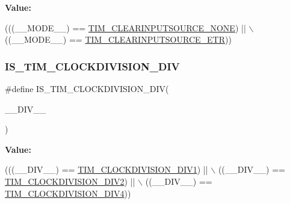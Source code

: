 {\bfseries Value\+:}
\begin{DoxyCode}
(((\_\_MODE\_\_) == \hyperlink{group___t_i_m___clear_input___source_ga48c5312aecd377fab00d62e9b4169e9e}{TIM\_CLEARINPUTSOURCE\_NONE})      || \(\backslash\)
                                             ((\_\_MODE\_\_) == 
      \hyperlink{group___t_i_m___clear_input___source_gaa28a8cf1db85cf6c845c6c1f02ba5c8e}{TIM\_CLEARINPUTSOURCE\_ETR}))
\end{DoxyCode}
\mbox{\label{group___t_i_m___private___macros_gac7f7ba7f6f173631c81176d4602c2f11}} 
\subsubsection{\texorpdfstring{I\+S\+\_\+\+T\+I\+M\+\_\+\+C\+L\+O\+C\+K\+D\+I\+V\+I\+S\+I\+O\+N\+\_\+\+D\+IV}{IS\_TIM\_CLOCKDIVISION\_DIV}}
{\footnotesize\ttfamily \#define I\+S\+\_\+\+T\+I\+M\+\_\+\+C\+L\+O\+C\+K\+D\+I\+V\+I\+S\+I\+O\+N\+\_\+\+D\+IV(\begin{DoxyParamCaption}\item[{}]{\+\_\+\+\_\+\+D\+I\+V\+\_\+\+\_\+ }\end{DoxyParamCaption})}

{\bfseries Value\+:}
\begin{DoxyCode}
(((\_\_DIV\_\_) == \hyperlink{group___t_i_m___clock_division_ga309297ccd407a836ede6a42d4dc479c1}{TIM\_CLOCKDIVISION\_DIV1}) || \(\backslash\)
                                            ((\_\_DIV\_\_) == \hyperlink{group___t_i_m___clock_division_gaf84a16da8edb80a3d8af91fbfc046181}{TIM\_CLOCKDIVISION\_DIV2}) || 
      \(\backslash\)
                                            ((\_\_DIV\_\_) == \hyperlink{group___t_i_m___clock_division_ga7cac7491610ffc135ea9ed54f769ddbc}{TIM\_CLOCKDIVISION\_DIV4}))
\end{DoxyCode}
\mbox{\label{group___t_i_m___private___macros_ga9bc34f35e8001150847d8cb4c7106fe9}} 
